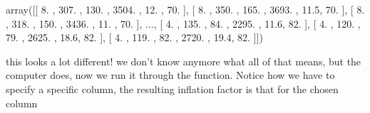\documentclass[letterpaper,10pt,english]{jupyterBook}
\begin{document}
\begin{sphinxVerbatim}[commandchars=\\\{\}]
  \PYG{p}{[}     \PYG{p}{]}
  \PYG{p}{[}\PYG{p}{]}
  
  
\end{sphinxVerbatim}

\begin{sphinxVerbatim}[commandchars=\\\{\}]
array([[   8. ,  307. ,  130. , 3504. ,   12. ,   70. ],
       [   8. ,  350. ,  165. , 3693. ,   11.5,   70. ],
       [   8. ,  318. ,  150. , 3436. ,   11. ,   70. ],
       ...,
       [   4. ,  135. ,   84. , 2295. ,   11.6,   82. ],
       [   4. ,  120. ,   79. , 2625. ,   18.6,   82. ],
       [   4. ,  119. ,   82. , 2720. ,   19.4,   82. ]])
\end{sphinxVerbatim}

\sphinxAtStartPar
this looks a lot different! we don’t know anymore what all of that means, but the computer does, now we run it through the function.
Notice how we have to specify a specific column, the resulting inflation factor is that for the chosen column

\begin{sphinxVerbatim}[commandchars=\\\{\}]
 
\end{sphinxVerbatim}
\end{document}
